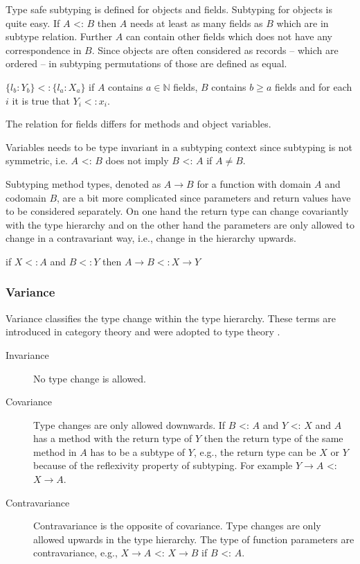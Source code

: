 Type safe subtyping is defined for objects and fields. Subtyping for objects is
quite easy. If $A$ <: $B$ then $A$ needs at least as many fields as $B$
which are in subtype relation. Further $A$ can contain other fields
which does not have any correspondence in $B$. Since objects are often considered
as records -- which are ordered -- in subtyping permutations of those are defined
as equal. 
\begin{defn}
	\label{def:subtypeObject}
	$\{l_b : Y_b\} <: \{l_a : X_a\}$ if $A$ contains $a \in \mathbb{N}$ fields, $B$ contains
	$b \geq a$ fields and for each $i$ it is true that $Y_i <: x_i$.
\end{defn}

The relation for fields differs for methods and object variables.

Variables needs to be type invariant in a subtyping context since
subtyping is not symmetric, i.e. $A$ <: $B$ does not imply $B$ <: $A$
if $A \neq B$.

Subtyping method types, denoted as $A \rightarrow B$ for a function with
domain $A$ and codomain $B$, are a bit more complicated since parameters
and return values have to be considered separately. On one hand the return
type can change covariantly with the type hierarchy and on the other hand
the parameters are only allowed to change in a contravariant way, i.e.,
change in the hierarchy upwards.

\begin{defn}
\label{def:methodSubtyping}
if $X <: A$ and $B <: Y$ then $A \rightarrow B <: X \rightarrow Y$
\end{defn}

\subsubsection{Variance}
Variance classifies the type change within the type hierarchy. These
terms are introduced in category theory and were adopted to type theory
\cite{pierce_basic_1991}.

\begin{description}
	\item[Invariance] No type change is allowed.
	\item[Covariance] Type changes are only allowed downwards. If $B$
	<: $A$ and $Y$ <: $X$ and $A$ has a method with the return
	type of $Y$ then the return type of the same method in $A$
	has to be a subtype of $Y$, e.g., the return type can be $X$
	or $Y$ because of the reflexivity property of subtyping. For
	example $Y \rightarrow A$ <: $X \rightarrow A$.
	\item[Contravariance] Contravariance is the opposite of
	covariance. Type changes are only allowed upwards in the type
	hierarchy. The type of function parameters are contravariance,
	e.g., $X \rightarrow A$ <: $X \rightarrow B$ if $B$ <: $A$.
\end{description}


